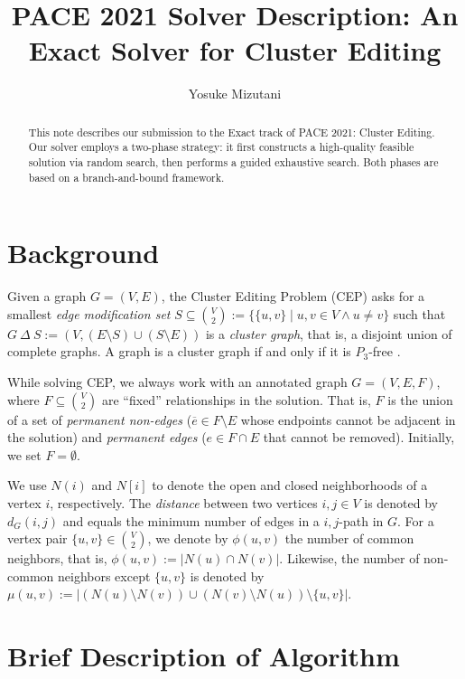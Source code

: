 \documentclass[a4paper,UKenglish,cleveref, autoref, thm-restate]{lipics-v2021}
\title{PACE 2021 Solver Description: An Exact Solver for Cluster Editing} %
\author{Yosuke Mizutani}{School of Computing, University of Utah, USA}{yos@cs.utah.edu}{}{}%
\begin{document}
\maketitle

\begin{abstract}
This note describes our submission to the Exact track of PACE 2021: Cluster Editing. Our solver employs a two-phase strategy: it first constructs a high-quality feasible solution via random search, then performs a guided exhaustive search. Both phases are based on a branch-and-bound framework.
\end{abstract}

\section{Background}
\label{sec:typesetting-summary}

Given a graph $G=(V,E)$, the Cluster Editing Problem (CEP) asks for a smallest \textit{edge modification set} $S \subseteq \binom{V}{2} := \{\{u,v\} \mid u,v \in V \wedge u \neq v\}$ such that $G \ \Delta\ S := (V,(E \setminus S) \cup (S \setminus E))$ is a \textit{cluster graph}, that is, a disjoint union of complete graphs. A graph is a cluster graph if and only if it is $P_3$-free \cite{shamir2004cluster}.

While solving CEP, we always work with an annotated graph $G=(V,E,F)$, where $F \subseteq \binom{V}{2}$ are ``fixed'' relationships in the solution. That is, $F$ is the union of a set of \textit{permanent non-edges} ($\overline{e} \in F \setminus E$ whose endpoints cannot be adjacent in the solution) and \textit{permanent edges} ($e \in F \cap E$ that cannot be removed). Initially, we set $F=\emptyset$.

We use  $N(i)$ and $N[i]$ to denote the open and closed neighborhoods of a vertex $i$, respectively. The \textit{distance} between two vertices $i,j\in V$ is denoted by $d_G(i,j)$ and equals the minimum number of edges in a $i,j$-path in $G$. For a vertex pair $\{u,v\} \in \binom{V}{2}$, we denote by $\phi(u,v)$ the number of common neighbors, that is, $\phi(u,v):=|N(u)\cap N(v)|$. Likewise, the number of non-common neighbors except $\{u,v\}$ is denoted by $\mu(u,v):=|(N(u)\setminus N(v)) \cup (N(v)\setminus N(u))\setminus \{u,v\}|$.

\section{Brief Description of Algorithm}
\end{document}
